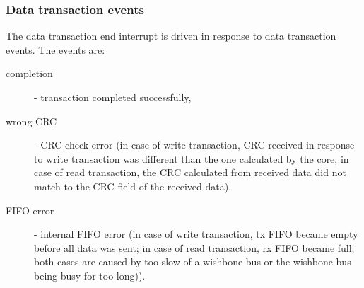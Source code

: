     \subsubsection{Data transaction events}
    \label{sec:data_events}

    The data transaction end interrupt is driven in response to data transaction events. The events are:
    \begin{description}
    \item[completion] - transaction completed successfully,
    \item[wrong CRC] - CRC check error (in case of write transaction, CRC received in response to write transaction was different than the one calculated by the core; 
    in case of read transaction, the CRC calculated from received data did not match to the CRC field of the received data),
    \item[FIFO error] - internal FIFO error (in case of write transaction, tx FIFO became empty before all data was sent; in case of read transaction, rx FIFO became
    full; both cases are caused by too slow of a wishbone bus or the wishbone bus being busy for too long)).
    \end{description}
    

    